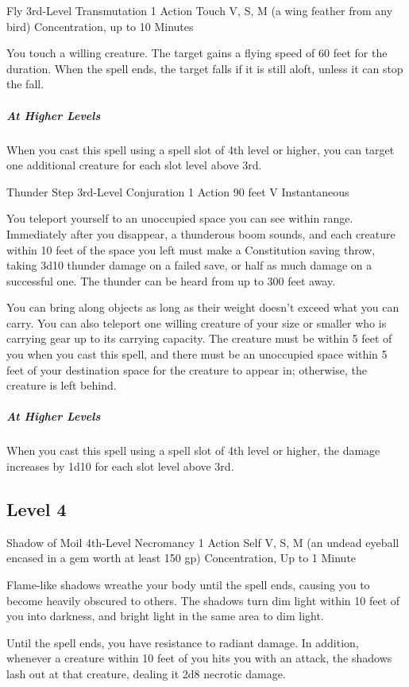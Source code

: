 {\DndSpellHeader
	{Fly}
	{3rd-Level Transmutation}
	{1 Action}
	{Touch}
	{V, S, M (a wing feather from any bird)}
	{Concentration, up to 10 Minutes}

You touch a willing creature. The target gains a flying speed of 60 feet for the duration. When the spell ends, the target falls if it is still aloft, unless it can stop the fall.

\subparagraph*{At Higher Levels} When you cast this spell using a spell slot of 4th level or higher, you can target one additional creature for each slot level above 3rd.

\DndSpellHeader
	{Thunder Step}
	{3rd-Level Conjuration}
	{1 Action}
	{90 feet}
	{V}
	{Instantaneous}

You teleport yourself to an unoccupied space you can see within range. Immediately after you disappear, a thunderous boom sounds, and each creature within 10 feet of the space you left must make a Constitution saving throw, taking 3d10 thunder damage on a failed save, or half as much damage on a successful one. The thunder can be heard from up to 300 feet away.

You can bring along objects as long as their weight doesn't exceed what you can carry. You can also teleport one willing creature of your size or smaller who is carrying gear up to its carrying capacity. The creature must be within 5 feet of you when you cast this spell, and there must be an unoccupied space within 5 feet of your destination space for the creature to appear in; otherwise, the creature is left behind.

\subparagraph*{At Higher Levels} When you cast this spell using a spell slot of 4th level or higher, the damage increases by 1d10 for each slot level above 3rd.

\subsection*{Level 4}
\DndSpellHeader
	{Shadow of Moil}
	{4th-Level Necromancy}
	{1 Action}
	{Self}
	{V, S, M (an undead eyeball encased in a gem worth at least 150 gp)}
	{Concentration, Up to 1 Minute}

Flame-like shadows wreathe your body until the spell ends, causing you to become heavily obscured to others. The shadows turn dim light within 10 feet of you into darkness, and bright light in the same area to dim light.

Until the spell ends, you have resistance to radiant damage. In addition, whenever a creature within 10 feet of you hits you with an attack, the shadows lash out at that creature, dealing it 2d8 necrotic damage.

}

